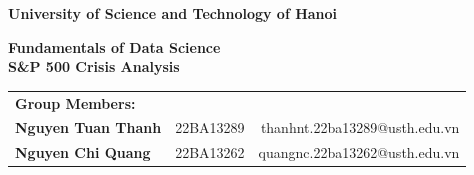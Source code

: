 \documentclass[a4paper,12pt]{report}
\begin{document}
\thispagestyle{empty}  %


\begin{center}
    
    {\Large \textbf{University of Science and Technology of Hanoi}}\\[0.75cm]
    
    
\begin{center}
\end{center}

    
    \vspace{1cm}
    {\LARGE \textbf{Fundamentals of Data Science}}\\[0.75cm]

    \vspace{0.5cm} %
    {\huge \textbf{S\&P 500 Crisis Analysis}}
    \vspace{1.5cm} %
\end{center}

\vspace{0.5cm}
\noindent
\begin{center}

    \begin{tabular}{l c r}
    
        \textbf{\large Group Members:}
        \vspace{0.5cm}
        \\
        \textbf{Nguyen Tuan Thanh} & 22BA13289 & thanhnt.22ba13289@usth.edu.vn
        \vspace{0.1cm}\\
        \textbf{Nguyen Chi Quang} & 22BA13262 & quangnc.22ba13262@usth.edu.vn \\
    \end{tabular}
\end{center}
\end{document}
